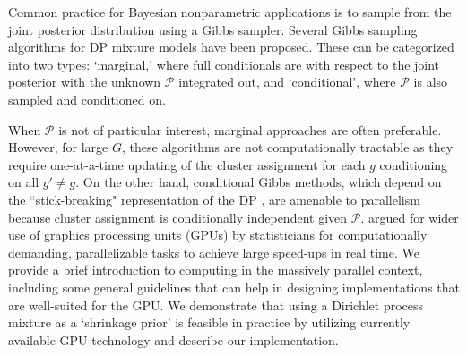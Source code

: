 Common practice for Bayesian nonparametric applications is to sample from the joint posterior distribution using a Gibbs sampler. Several Gibbs sampling algorithms for DP mixture models have been proposed. These can be categorized into two types: `marginal,' where full conditionals are with respect to the joint posterior with the unknown $\mathcal{P}$ integrated out, and `conditional', where $\mathcal{P}$ is also sampled and conditioned on.

When $\mathcal{P}$ is not of particular interest, marginal approaches are often preferable. However, for large $G$, these algorithms are not computationally tractable as they require one-at-a-time updating of the cluster assignment for each $g$ conditioning on all $g'\neq g$. On the other hand, conditional Gibbs methods, which depend on the ``stick-breaking" representation of the DP \citet{sethuraman}, are amenable to parallelism because cluster assignment is conditionally independent given $\mathcal{P}$. \citet{suchard} argued for wider use of graphics processing units (GPUs) by statisticians for computationally demanding, parallelizable tasks to achieve large speed-ups in real time. We provide a brief introduction to computing in the massively parallel context, including some general guidelines that can help in designing implementations that are well-suited for the GPU. We demonstrate that using a Dirichlet process mixture as a `shrinkage prior' is feasible in practice by utilizing currently available GPU technology and describe our implementation.

